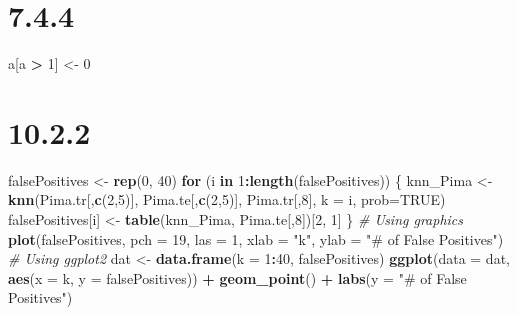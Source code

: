 \documentclass[
]{krantz}
\newenvironment{Shaded}{\begin{snugshade}}{\end{snugshade}}
\newcommand{\CommentTok}[1]{\textcolor[rgb]{0.56,0.35,0.01}{\textit{#1}}}
\newcommand{\ControlFlowTok}[1]{\textcolor[rgb]{0.13,0.29,0.53}{\textbf{#1}}}
\newcommand{\DataTypeTok}[1]{\textcolor[rgb]{0.13,0.29,0.53}{#1}}
\newcommand{\DecValTok}[1]{\textcolor[rgb]{0.00,0.00,0.81}{#1}}
\newcommand{\KeywordTok}[1]{\textcolor[rgb]{0.13,0.29,0.53}{\textbf{#1}}}
\newcommand{\NormalTok}[1]{#1}
\newcommand{\OperatorTok}[1]{\textcolor[rgb]{0.81,0.36,0.00}{\textbf{#1}}}
\newcommand{\OtherTok}[1]{\textcolor[rgb]{0.56,0.35,0.01}{#1}}
\newcommand{\StringTok}[1]{\textcolor[rgb]{0.31,0.60,0.02}{#1}}
\begin{document}
\hypertarget{section-10}{%
\section*{7.4.4}\label{section-10}}


\begin{Shaded}
\begin{Highlighting}[]
\NormalTok{a[a }\OperatorTok{\textgreater{}}\StringTok{ }\DecValTok{1}\NormalTok{] \textless{}{-}}\StringTok{ }\DecValTok{0}
\end{Highlighting}
\end{Shaded}

\hypertarget{section-11}{%
\section*{10.2.2}\label{section-11}}


\begin{Shaded}
\begin{Highlighting}[]
\NormalTok{falsePositives \textless{}{-}}\StringTok{ }\KeywordTok{rep}\NormalTok{(}\DecValTok{0}\NormalTok{, }\DecValTok{40}\NormalTok{)}
\ControlFlowTok{for}\NormalTok{ (i }\ControlFlowTok{in} \DecValTok{1}\OperatorTok{:}\KeywordTok{length}\NormalTok{(falsePositives)) \{}
\NormalTok{  knn\_Pima \textless{}{-}}\StringTok{ }\KeywordTok{knn}\NormalTok{(Pima.tr[,}\KeywordTok{c}\NormalTok{(}\DecValTok{2}\NormalTok{,}\DecValTok{5}\NormalTok{)], Pima.te[,}\KeywordTok{c}\NormalTok{(}\DecValTok{2}\NormalTok{,}\DecValTok{5}\NormalTok{)], Pima.tr[,}\DecValTok{8}\NormalTok{], }\DataTypeTok{k =}\NormalTok{ i, }\DataTypeTok{prob=}\OtherTok{TRUE}\NormalTok{)}
\NormalTok{  falsePositives[i] \textless{}{-}}\StringTok{ }\KeywordTok{table}\NormalTok{(knn\_Pima, Pima.te[,}\DecValTok{8}\NormalTok{])[}\DecValTok{2}\NormalTok{, }\DecValTok{1}\NormalTok{]}
\NormalTok{\}}
\CommentTok{\# Using graphics}
\KeywordTok{plot}\NormalTok{(falsePositives, }\DataTypeTok{pch =} \DecValTok{19}\NormalTok{, }\DataTypeTok{las =} \DecValTok{1}\NormalTok{, }\DataTypeTok{xlab =} \StringTok{"k"}\NormalTok{, }\DataTypeTok{ylab =} \StringTok{"\# of False Positives"}\NormalTok{)}
\CommentTok{\# Using ggplot2}
\NormalTok{dat \textless{}{-}}\StringTok{ }\KeywordTok{data.frame}\NormalTok{(}\DataTypeTok{k =} \DecValTok{1}\OperatorTok{:}\DecValTok{40}\NormalTok{, falsePositives)}
\KeywordTok{ggplot}\NormalTok{(}\DataTypeTok{data =}\NormalTok{ dat, }\KeywordTok{aes}\NormalTok{(}\DataTypeTok{x =}\NormalTok{ k, }\DataTypeTok{y =}\NormalTok{ falsePositives)) }\OperatorTok{+}\StringTok{ }
\StringTok{  }\KeywordTok{geom\_point}\NormalTok{() }\OperatorTok{+}\StringTok{ }
\StringTok{  }\KeywordTok{labs}\NormalTok{(}\DataTypeTok{y =} \StringTok{"\# of False Positives"}\NormalTok{)}
\end{Highlighting}
\end{Shaded}
\end{document}
